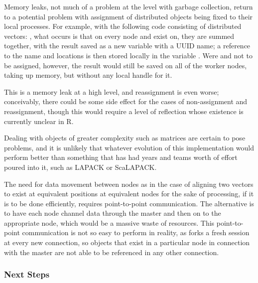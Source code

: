 Memory leaks, not much of a problem at the \R{} level with garbage collection, return to a potential problem with assignment of distributed objects being fixed to their local \R{} processes.
For example, with the following code consisting of distributed vectors: , what occurs is that on every node  and  exist on, they are summed together, with the result saved as a new variable with a UUID name; a reference to the name and locations is then stored locally in the variable .
Were  and  not to be assigned, however, the result would still be saved on all of the worker nodes, taking up memory, but without any local handle for it.

This is a memory leak at a high level, and reassignment is even worse; conceivably, there could be some side effect for the cases of non-assignment and reassignment, though this would require a level of reflection whose existence is currently unclear in R.

Dealing with objects of greater complexity such as matrices are certain to pose problems, and it is unlikely that whatever evolution of this implementation would perform better than something that has had years and teams worth of effort poured into it, such as LAPACK or ScaLAPACK.

The need for data movement between nodes as in the case of aligning two vectors to exist at equivalent positions at equivalent nodes for the sake of processing, if it is to be done efficiently, requires point-to-point communication.
The alternative is to have each node channel data through the master and then on to the appropriate node, which would be a massive waste of resources.
This point-to-point communication is not so easy to perform in reality, as  forks a fresh \R{} session at every new connection, so objects that exist in a particular node in connection with the master are not able to be referenced in any other connection.

\subsubsection{Next Steps}\label{next-steps}


